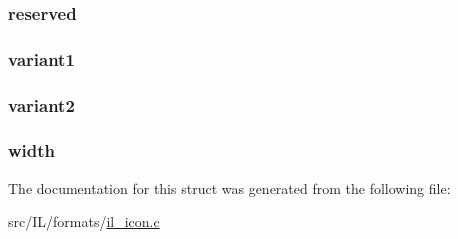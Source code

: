 \hypertarget{struct_i_c_o_n_d_i_r_e_n_t_r_y_a32acc012851fc2bad318c8a2e590bc75}{
\subsubsection[{reserved}]{ reserved}}\label{struct_i_c_o_n_d_i_r_e_n_t_r_y_a32acc012851fc2bad318c8a2e590bc75}
\hypertarget{struct_i_c_o_n_d_i_r_e_n_t_r_y_a91e0635e8d3f24a3701962cb0e773f73}{
\subsubsection[{variant1}]{ variant1}}\label{struct_i_c_o_n_d_i_r_e_n_t_r_y_a91e0635e8d3f24a3701962cb0e773f73}
\hypertarget{struct_i_c_o_n_d_i_r_e_n_t_r_y_acef2b67a0cc8e94ec1c5514d71cee6ab}{
\subsubsection[{variant2}]{ variant2}}\label{struct_i_c_o_n_d_i_r_e_n_t_r_y_acef2b67a0cc8e94ec1c5514d71cee6ab}
\hypertarget{struct_i_c_o_n_d_i_r_e_n_t_r_y_ad471bc246135d293139a6d1615727c48}{
\subsubsection[{width}]{ width}}\label{struct_i_c_o_n_d_i_r_e_n_t_r_y_ad471bc246135d293139a6d1615727c48}


The documentation for this struct was generated from the following file\-:\begin{DoxyCompactItemize}
\item 
src/\-I\-L/formats/\hyperlink{il__icon_8c}{il\-\_\-icon.\-c}\end{DoxyCompactItemize}
